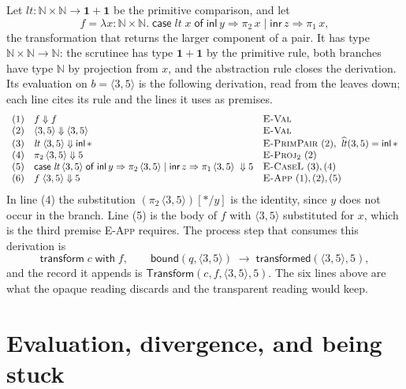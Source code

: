 \documentclass[11pt,openany]{book}
\theoremstyle{remark}
\newcommand{\Transform}{\mathsf{Transform}}
\begin{document}
Let $\mathit{lt}:\mathbb N\times\mathbb N\to\mathbf 1+\mathbf 1$ be the
primitive comparison, and let
\[
f=\lambda x{:}\mathbb N\times\mathbb N.\;
\mathsf{case}\;\mathit{lt}\;x\;\mathsf{of}\;
\mathsf{inl}\,y\Rightarrow\pi_2\,x\mid\mathsf{inr}\,z\Rightarrow\pi_1\,x,
\]
the transformation that returns the larger component of a pair. It has
type $\mathbb N\times\mathbb N\to\mathbb N$: the scrutinee has type
$\mathbf 1+\mathbf 1$ by the primitive rule, both branches have type
$\mathbb N$ by projection from $x$, and the abstraction rule closes the
derivation. Its evaluation on $b=\langle 3,5\rangle$ is the following
derivation, read from the leaves down; each line cites its rule and the
lines it uses as premises.
{\small
\[
\begin{array}{rll}
(1) & f\Downarrow f & \textsc{E-Val}\\
(2) & \langle 3,5\rangle\Downarrow\langle 3,5\rangle & \textsc{E-Val}\\
(3) & \mathit{lt}\;\langle 3,5\rangle\Downarrow\mathsf{inl}\,\ast
    & \textsc{E-PrimPair}\ (2),\ \widehat{\mathit{lt}}(3,5)=\mathsf{inl}\,\ast\\
(4) & \pi_2\,\langle 3,5\rangle\Downarrow 5 & \textsc{E-Proj}_2\ (2)\\
(5) & \mathsf{case}\;\mathit{lt}\,\langle 3,5\rangle\;\mathsf{of}\;
      \mathsf{inl}\,y\Rightarrow\pi_2\,\langle 3,5\rangle\mid
      \mathsf{inr}\,z\Rightarrow\pi_1\,\langle 3,5\rangle\;\Downarrow 5
    & \textsc{E-CaseL}\ (3),(4)\\
(6) & f\;\langle 3,5\rangle\Downarrow 5 & \textsc{E-App}\ (1),(2),(5)
\end{array}
\]
}
In line (4) the substitution $(\pi_2\,\langle 3,5\rangle)[\ast/y]$ is the
identity, since $y$ does not occur in the branch. Line (5) is the body of
$f$ with $\langle 3,5\rangle$ substituted for $x$, which is the third
premise \textsc{E-App} requires. The process step that consumes this
derivation is
\[
\mathsf{transform}\;c\;\mathsf{with}\;f,
\qquad
\mathsf{bound}(q,\langle 3,5\rangle)\;\longrightarrow\;
\mathsf{transformed}(\langle 3,5\rangle,5),
\]
and the record it appends is $\Transform(c,f,\langle 3,5\rangle,5)$. The
six lines above are what the opaque reading discards and the transparent
reading would keep.

\section{Evaluation, divergence, and being stuck}
\end{document}
